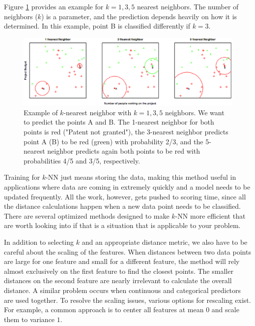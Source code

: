 \documentclass[]{krantz}
\begin{document}
Figure \ref{fig:knn} provides an example for \(k = 1, 3, 5\) nearest
neighbors. The number of neighbors (\(k\)) is a parameter, and the
prediction depends heavily on how it is determined. In this example,
point B is classified differently if \(k = 3\).

\begin{figure}

{\centering \includegraphics[width=0.7\linewidth]{ChapterML/figures/knn} 

}

\caption{Example of $k$-nearest neighbor with $k = 1, 3, 5$ neighbors. We want to predict the points A and B. The 1-nearest neighbor for both points is red ("Patent not granted"), the 3-nearest neighbor predicts point A (B) to be red (green) with probability 2/3, and the 5-nearest neighbor predicts again both points to be red with probabilities 4/5 and 3/5, respectively.}\label{fig:knn}
\end{figure}

Training for \(k\)-NN just means storing the data, making this method
useful in applications where data are coming in extremely quickly and a
model needs to be updated frequently. All the work, however, gets pushed
to scoring time, since all the distance calculations happen when a new
data point needs to be classified. There are several optimized methods
designed to make \(k\)-NN more efficient that are worth looking into if
that is a situation that is applicable to your problem.

In addition to selecting \(k\) and an appropriate distance metric, we
also have to be careful about the scaling of the features. When
distances between two data points are large for one feature and small
for a different feature, the method will rely almost exclusively on the
first feature to find the closest points. The smaller distances on the
second feature are nearly irrelevant to calculate the overall distance.
A similar problem occurs when continuous and categorical predictors are
used together. To resolve the scaling issues, various options for
rescaling exist. For example, a common approach is to center all
features at mean \(0\) and scale them to variance \(1\).
\end{document}
